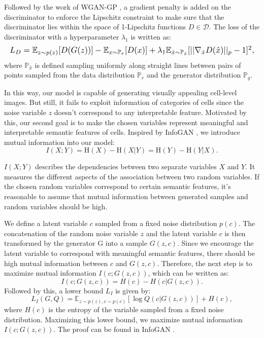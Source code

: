 \documentclass[journal]{IEEEtran}
\begin{document}
Followed by the work of WGAN-GP \cite{gulrajani2017improved}, a gradient penalty is added on the discriminator to enforce the Lipschitz constraint to make sure that the discriminator lies within the space of 1-Lipschitz functions $D\in\mathcal{D}$. The loss of the discriminator with a hyperparameter $\lambda_1$ is written as:
\begin{equation}
\resizebox{1\hsize}{!}{$L_D = \mathbb{E}_{z \sim p(z)} [D(G(z))] - \mathbb{E}_{x \sim \mathbb{P}_r} [D(x)]+ \lambda_1 \mathbb{E}_{\hat x \sim \mathbb{P}_{\hat x}} [ || \nabla_{\hat x} D(\hat x) ||_p - 1 ]^2,$}
\end{equation} where $\mathbb{P}_{\hat x}$ is defined sampling uniformly along straight lines between pairs of points sampled from the data distribution $\mathbb{P}_r$ and the generator distribution $\mathbb{P}_g$.

In this way, our model is capable of generating visually appealing cell-level images. But still, it fails to exploit information of categories of cells since the noise variable $z$ doesn't correspond to any interpretable feature. Motivated by this, our second goal is to make the chosen variables represent meaningful and interpretable semantic features of cells. Inspired by InfoGAN \cite{chen2016infoGAN}, we introduce mutual information into our model:
\begin{equation}
I(X;Y) = \mathrm {H} (X)-\mathrm {H} (X|Y) = \mathrm {H} (Y) -\mathrm {H} (Y|X).
\label{mutual}
\end{equation}

$I(X;Y)$ describes the dependencies between two separate variables $X$ and $Y$. It measures the different aspects of the association between two random variables. If the chosen random variables correspond to certain semantic features, it's reasonable to assume that mutual information between generated samples and random variables should be high.

We define a latent variable $c$ sampled from a fixed noise distribution $p(c)$. The concatenation of the random noise variable $z$ and the latent variable $c$ is then transformed by the generator G into a sample $G(z,c)$. Since we encourage the latent variable to correspond with meaningful semantic features, there should be high mutual information between $c$ and $G(z, c)$. Therefore, the next step is to maximize mutual information $I(c;G(z,c))$, which can be written as:
\begin{equation}
I(c;G(z,c)) =  H(c) - H(c \vert G(z,c)).
\end{equation} Followed by this, a lower bound $L_I$ is given by:
\begin{equation}
L_I(G, Q) = \mathbb{E}_{z \sim p(z), c \sim p(c)}[\log Q(c \vert G(z,c))] + H(c),
\end{equation} where $H(c)$ is the entropy of the variable sampled from a fixed noise distribution. Maximizing this lower bound, we maximize mutual information $I(c;G(z,c))$. The proof can be found in InfoGAN \cite{chen2016infoGAN}.
\end{document}
